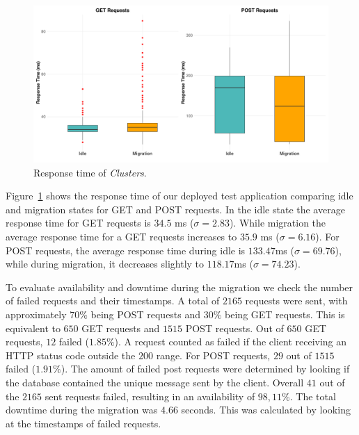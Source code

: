 \begin{figure}[t]
    \centering
    \includegraphics[scale=0.3]{figures/response-time.pdf}
    \caption{Response time of \textit{Clusters}. 
    }
    \label{fig:response-time}
\end{figure}
%
Figure~\ref{fig:response-time} shows the response time of our deployed test application comparing idle and migration states for GET and POST requests.
In the idle state the average response time for GET requests is $34.5$ ms ($\sigma=2.83$).
While migration the average response time for a GET requests increases to $35.9$ ms ($\sigma=6.16$).
For POST requests, the average response time during idle is $133.47$ms ($\sigma=69.76$), while during migration, it decreases slightly to $118.17$ms ($\sigma=74.23$).

To evaluate availability and downtime during the migration we check the number of failed requests and their timestamps.
A total of $2165$ requests were sent, with approximately $70\%$ being POST requests and $30\%$ being GET requests.
This is equivalent to $650$ GET requests and $1515$ POST requests.
Out of $650$ GET requests, $12$ failed ($1.85\%$). 
A request counted as failed if the client receiving an HTTP status code outside the $200$ range. 
For POST requests, $29$ out of $1515$ failed ($1.91\%$).
The amount of failed post requests were determined by looking if the database contained the unique message sent by the client. 
Overall $41$ out of the $2165$ sent requests failed, resulting in an availability of $98,11\%$. 
The total downtime during the migration was $4.66$ seconds. 
This was calculated by looking at the timestamps of failed requests.
